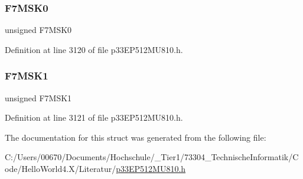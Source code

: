 \subsubsection{\texorpdfstring{F7\+M\+S\+K0}{F7MSK0}}
{\footnotesize\ttfamily unsigned F7\+M\+S\+K0}



Definition at line 3120 of file p33\+E\+P512\+M\+U810.\+h.

\mbox{\label{structtag_c1_f_m_s_k_s_e_l1_b_i_t_s_a09603fe5f0ffe52b1ab15fea39319ab2}} 
\subsubsection{\texorpdfstring{F7\+M\+S\+K1}{F7MSK1}}
{\footnotesize\ttfamily unsigned F7\+M\+S\+K1}



Definition at line 3121 of file p33\+E\+P512\+M\+U810.\+h.



The documentation for this struct was generated from the following file\+:\begin{DoxyCompactItemize}
\item 
C\+:/\+Users/00670/\+Documents/\+Hochschule/\+\_\+\+Tier1/73304\+\_\+\+Technische\+Informatik/\+Code/\+Hello\+World4.\+X/\+Literatur/\hyperlink{p33_e_p512_m_u810_8h}{p33\+E\+P512\+M\+U810.\+h}\end{DoxyCompactItemize}

